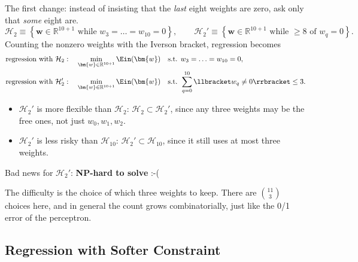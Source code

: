 The first change: instead of insisting that the \emph{last} eight weights are
zero, ask only that \emph{some} eight are.
\[
    \mathcal{H}_2 \equiv \left\{ \bm{w} \in \mathbb{R}^{10+1} \text{ while }
    w_3 = \ldots = w_{10} = 0 \right\} ,
    \qquad
    \mathcal{H}_2' \equiv \left\{ \bm{w} \in \mathbb{R}^{10+1} \text{ while }
    \ge 8 \text{ of } w_q = 0 \right\} .
\]
Counting the nonzero weights with the Iverson bracket, regression becomes
\begin{align*}
    \text{regression with } \mathcal{H}_2&: \quad \min_{\bm{w} \in
    \mathbb{R}^{10+1}} \Ein(\bm{w}) \quad \text{s.t. } w_3 = \ldots = w_{10}
    = 0 ,\\
    \text{regression with } \mathcal{H}_2'&: \quad \min_{\bm{w} \in
    \mathbb{R}^{10+1}} \Ein(\bm{w}) \quad \text{s.t. } \sum_{q=0}^{10}
    \llbracket w_q \neq 0 \rrbracket \le 3 .
\end{align*}
\begin{itemize}
    \item \(\mathcal{H}_2'\) is more flexible than \(\mathcal{H}_2\):
        \(\mathcal{H}_2 \subset \mathcal{H}_2'\), since any three weights may
        be the free ones, not just \(w_0, w_1, w_2\).
    \item \(\mathcal{H}_2'\) is less risky than \(\mathcal{H}_{10}\):
        \(\mathcal{H}_2' \subset \mathcal{H}_{10}\), since it still uses at
        most three weights.
\end{itemize}

\begin{moral}
    Bad news for  \(\mathcal{H}_2'\):
    \textbf{NP-hard to solve} :-(
\end{moral}

The difficulty is the choice of which three weights to keep. There are
\(\binom{11}{3}\) choices here, and in general the count grows combinatorially,
just like the 0/1 error of the perceptron.

\subsection{Regression with Softer Constraint}

